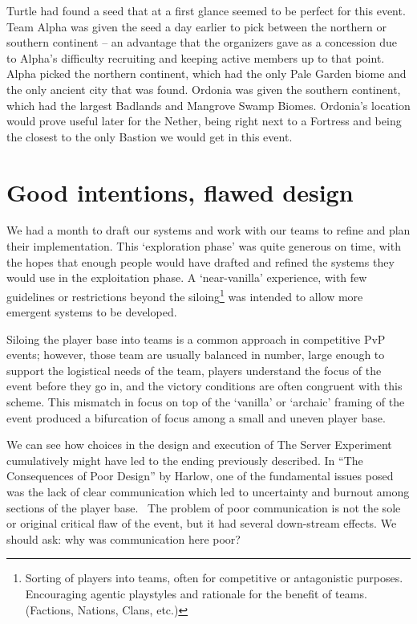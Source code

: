 Turtle had found a seed that at a first glance seemed to be perfect for this event. Team Alpha was given the seed a day earlier to pick between the northern or southern continent – an advantage that the organizers gave as a concession due to Alpha's difficulty recruiting and keeping active members up to that point. Alpha picked the northern continent, which had the only Pale Garden biome and the only ancient city that was found. Ordonia was given the southern continent, which had the largest Badlands and Mangrove Swamp Biomes. Ordonia's location would prove useful later for the Nether, being right next to a Fortress and being the closest to the only Bastion we would get in this event.

\section{Good intentions, flawed design}
We had a month to draft our systems and work with our teams to refine and plan their implementation. This `exploration phase' was quite generous on time, with the hopes that enough people would have drafted and refined the systems they would use in the exploitation phase. A `near-vanilla' experience, with few guidelines or restrictions beyond the siloing\footnote{Sorting of players into teams, often for competitive or antagonistic purposes. Encouraging agentic playstyles and rationale for the benefit of teams. (Factions, Nations, Clans, etc.)} was intended to allow more emergent systems to be developed.

Siloing the player base into teams is a common approach in competitive PvP events; however, those team are usually balanced in number, large enough to support the logistical needs of the team, players understand the focus of the event before they go in, and the victory conditions are often congruent with this scheme. This mismatch in focus on top of the `vanilla' or `archaic' framing of the event produced a bifurcation of focus among a small and uneven player base.

We can see how choices in the design and execution of The Server Experiment cumulatively might have led to the ending previously described. In “The Consequences of Poor Design” by Harlow, one of the fundamental issues posed was the lack of clear communication which led to uncertainty and burnout among sections of the player base.~\citep{Harlow(2026)} The problem of poor communication is not the sole or original critical flaw of the event, but it had several down-stream effects. We should ask: why was communication here poor?

